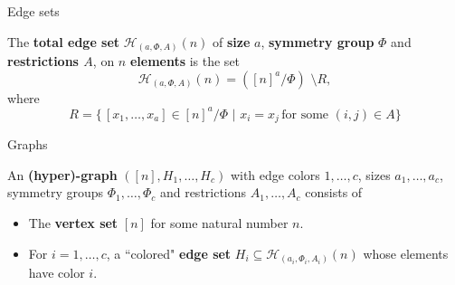 \documentclass[11pt]{beamer}
\begin{document}
	\begin{frame}{Edge sets}
		\begin{definition}
		The \textbf{total edge set} $\mathcal{H}_{(a,\Phi, A)}(n)$ of \textbf{size} $a$, 
		\textbf{symmetry group} $\Phi$ and
		\textbf{restrictions $A$}, on $n$ \textbf{elements} is the set
		\[ \mathcal{H}_{(a,\Phi, A)}(n)= ([n]^a/\Phi) \, \,
		\setminus R, \]
		where
		\[ R = \{\,  [x_1, \dots,x_a] \in [n]^a/\Phi  \, \, 
		| \, \, x_i=x_j \, \text{for some } (i,j)\in A \} \] 
		\end{definition}
	\end{frame}
	\begin{frame}{Graphs}
		\begin{definition}
			An \textbf{(hyper)-graph} $([n], H_1,\dots, H_c)$ with edge colors 
			$1,\dots, c$, sizes $a_1,\dots,a_c$, 
			symmetry groups $\Phi_1,\dots,\Phi_c$ and 
			restrictions $A_1,\dots,A_c$ consists of 
			\begin{itemize}
				\vspace{1em}
				\item The \textbf{vertex set} $[n]$ for some natural number $n$.
				\vspace{1em}
				\item For $i=1,\dots,c$, a ``colored" \textbf{edge set} $H_i\subseteq \mathcal{H}_{(a_i,\Phi_i,A_i)}(n)$ whose elements 
				have color $i$.
			\end{itemize}
		\end{definition}
	\end{frame}
	 
\end{document}
